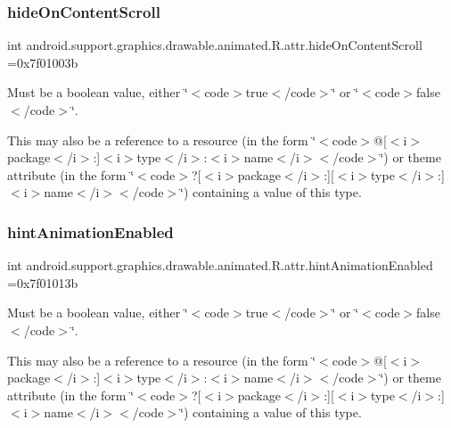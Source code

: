 \subsubsection{\texorpdfstring{hide\+On\+Content\+Scroll}{hideOnContentScroll}}
{\footnotesize\ttfamily int android.\+support.\+graphics.\+drawable.\+animated.\+R.\+attr.\+hide\+On\+Content\+Scroll =0x7f01003b\hspace{0.3cm}{\ttfamily [static]}}

Must be a boolean value, either \char`\"{}$<$code$>$true$<$/code$>$\char`\"{} or \char`\"{}$<$code$>$false$<$/code$>$\char`\"{}. 

This may also be a reference to a resource (in the form \char`\"{}$<$code$>$@\mbox{[}$<$i$>$package$<$/i$>$\+:\mbox{]}$<$i$>$type$<$/i$>$\+:$<$i$>$name$<$/i$>$$<$/code$>$\char`\"{}) or theme attribute (in the form \char`\"{}$<$code$>$?\mbox{[}$<$i$>$package$<$/i$>$\+:\mbox{]}\mbox{[}$<$i$>$type$<$/i$>$\+:\mbox{]}$<$i$>$name$<$/i$>$$<$/code$>$\char`\"{}) containing a value of this type. \mbox{\label{classandroid_1_1support_1_1graphics_1_1drawable_1_1animated_1_1R_1_1attr_a148fa3a321bb89435d0f72bce7b06937}} 
\subsubsection{\texorpdfstring{hint\+Animation\+Enabled}{hintAnimationEnabled}}
{\footnotesize\ttfamily int android.\+support.\+graphics.\+drawable.\+animated.\+R.\+attr.\+hint\+Animation\+Enabled =0x7f01013b\hspace{0.3cm}{\ttfamily [static]}}

Must be a boolean value, either \char`\"{}$<$code$>$true$<$/code$>$\char`\"{} or \char`\"{}$<$code$>$false$<$/code$>$\char`\"{}. 

This may also be a reference to a resource (in the form \char`\"{}$<$code$>$@\mbox{[}$<$i$>$package$<$/i$>$\+:\mbox{]}$<$i$>$type$<$/i$>$\+:$<$i$>$name$<$/i$>$$<$/code$>$\char`\"{}) or theme attribute (in the form \char`\"{}$<$code$>$?\mbox{[}$<$i$>$package$<$/i$>$\+:\mbox{]}\mbox{[}$<$i$>$type$<$/i$>$\+:\mbox{]}$<$i$>$name$<$/i$>$$<$/code$>$\char`\"{}) containing a value of this type. \mbox{\label{classandroid_1_1support_1_1graphics_1_1drawable_1_1animated_1_1R_1_1attr_a7e21571ca0a58f9d9a356f4b193a8ad5}} 
